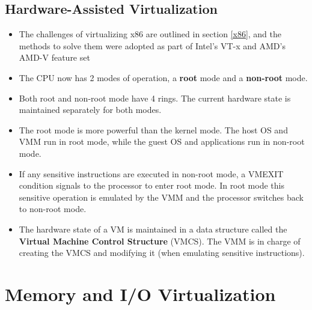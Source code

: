 \documentclass{article}
\begin{document}
\subsection{Hardware-Assisted Virtualization}
\begin{itemize}
    \item The challenges of virtualizing x86 are outlined in section \ref{x86}, and the methods to solve them were adopted as part of Intel's VT-x and AMD's AMD-V feature set 
    
    \item The CPU now has 2 modes of operation, a \textbf{root} mode and a \textbf{non-root} mode. 
    
    \item Both root and non-root mode have 4 rings. The current hardware state is maintained separately for both modes. 
    
    \item The root mode is more powerful than the kernel mode. The host OS and VMM run in root mode, while the guest OS and applications run in non-root mode.
    
    \item If any sensitive instructions are executed in non-root mode, a VMEXIT condition signals to the processor to enter root mode. In root mode this sensitive operation is emulated by the VMM and the processor switches back to non-root mode. 
    
    \item The hardware state of a VM is maintained in a data structure called the \textbf{Virtual Machine Control Structure} (VMCS). The VMM is in charge of creating the VMCS and modifying it (when emulating sensitive instructions).
\end{itemize}

\section{Memory and I/O Virtualization}
\end{document}
